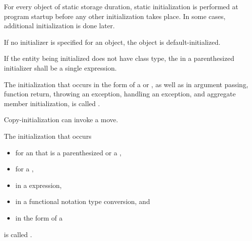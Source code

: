 \pnum
\begin{note}
For every object of static storage duration,
static initialization is performed
at program startup before any other initialization takes place.
In some cases, additional initialization is done later.
\end{note}

\pnum
If no initializer is specified for an object, the object is default-initialized.

\pnum
If the entity being initialized does not have class type, the
 in a
parenthesized initializer shall be a single expression.

\pnum
{}%
%
The initialization that occurs in the \tcode{=} form of a
 or
,
as well as in argument passing, function return,
throwing an exception,
handling an exception,
and aggregate member initialization,
is called
.
\begin{note}
Copy-initialization can invoke a move.
\end{note}

\pnum
The initialization that occurs
\begin{itemize}
\item for an  that is a
parenthesized  or a ,
\item for a ,
\item in a  expression,
\item in a functional notation type conversion, and
\item in the  form of a 
\end{itemize}
is called
.

